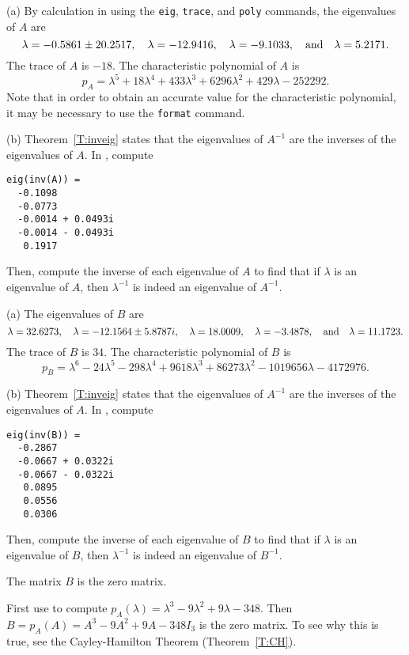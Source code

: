 \documentclass{ximera}
\begin{document}
(a) By calculation in \Matlab using the {\tt eig}, {\tt trace}, and
{\tt poly} commands, the eigenvalues of $A$ are 
\[
\lambda = -0.5861 \pm 20.2517, \quad
\lambda = -12.9416, \quad
\lambda = -9.1033, \quad\mbox{and}\quad
\lambda = 5.2171.
\]
The trace of $A$ is $-18$.  The characteristic polynomial of $A$ is
\[
p_A = \lambda^5 + 18\lambda^4 + 433\lambda^3 + 6296\lambda^2 +
429\lambda - 252292.
\]
Note that in order to obtain an accurate value for the characteristic
polynomial, it may be necessary to use the {\tt format} command.

(b) Theorem~\ref{T:inveig} states that the eigenvalues of $A^{-1}$ are
the inverses of the eigenvalues of $A$.  In \Matlab, compute
\begin{verbatim}
eig(inv(A)) =
  -0.1098    
  -0.0773    
  -0.0014 + 0.0493i
  -0.0014 - 0.0493i
   0.1917
\end{verbatim}
Then, compute the inverse of each eigenvalue of $A$ to find that if
$\lambda$ is an eigenvalue of $A$, then $\lambda^{-1}$ is indeed an
eigenvalue of $A^{-1}$. 

(a) The eigenvalues of $B$ are
\[
\lambda = 32.6273, \quad
\lambda = -12.1564 \pm 5.8787i, \quad
\lambda = 18.0009, \quad
\lambda = -3.4878, \quad\mbox{and}\quad 
\lambda = 11.1723.
\]
The trace of $B$ is $34$.  The characteristic polynomial of $B$ is
\[
p_B = \lambda^6 - 24\lambda^5 - 298\lambda^4 + 9618\lambda^3
+ 86273\lambda^2 - 1019656\lambda - 4172976.
\]

(b) Theorem~\ref{T:inveig} states that the eigenvalues of $A^{-1}$ are
the inverses of the eigenvalues of $A$.  In \Matlab, compute
\begin{verbatim}
eig(inv(B)) =
  -0.2867
  -0.0667 + 0.0322i
  -0.0667 - 0.0322i
   0.0895
   0.0556
   0.0306
\end{verbatim}
Then, compute the inverse of each eigenvalue of $B$ to find that if
$\lambda$ is an eigenvalue of $B$, then $\lambda^{-1}$
is indeed an eigenvalue of $B^{-1}$.

\ans The matrix $B$ is the zero matrix.

\soln First use \Matlab to compute
$p_A(\lambda) = \lambda^3 - 9\lambda^2 + 9\lambda - 348$.  Then
$B = p_A(A) = A^3 - 9A^2 + 9A - 348I_3$ is the zero matrix.  To
see why this is true, see the Cayley-Hamilton Theorem
(Theorem~\ref{T:CH}).
\end{document}
